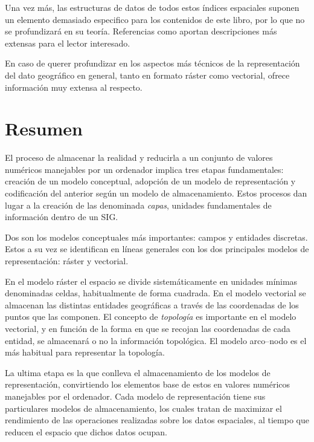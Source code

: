 \begin{multicols}{2}
Una vez más, las estructuras de datos de todos estos índices espaciales suponen un elemento demasiado especifico para los contenidos de este libro, por lo que no se profundizará en su teoría. Referencias como \cite{Buchmann1990Springer} aportan descripciones más extensas para el lector interesado.

En caso de querer profundizar en los aspectos más técnicos de la representación del dato geográfico en general, tanto en formato ráster como vectorial, \cite{Worboys2004CRC} ofrece información muy extensa al respecto.

\section{Resumen}

El proceso de almacenar la realidad y reducirla a un conjunto de valores numéricos manejables por un ordenador implica tres etapas fundamentales: creación de un modelo conceptual, adopción de un modelo de representación y codificación del anterior según un modelo de almacenamiento. Estos procesos dan lugar a la creación de las denominada \emph{capas}, unidades fundamentales de información dentro de un SIG.

Dos son los modelos conceptuales más importantes: campos y entidades discretas. Estos a su vez se identifican en líneas generales con los dos principales modelos de representación: ráster y vectorial.

En el modelo ráster el espacio se divide sistemáticamente en unidades mínimas denominadas celdas, habitualmente de forma cuadrada. En el modelo vectorial se almacenan las distintas entidades geográficas a través de las coordenadas de los puntos que las componen. El concepto de \emph{topología} es importante en el modelo vectorial, y en función de la forma en que se recojan las coordenadas de cada entidad, se almacenará o no la información topológica. El modelo arco--nodo es el más habitual para representar la topología.

La ultima etapa es la que conlleva el almacenamiento de los modelos de representación, convirtiendo los elementos base de estos en valores numéricos manejables por el ordenador. Cada modelo de representación tiene sus particulares modelos de almacenamiento, los cuales tratan de maximizar el rendimiento de las operaciones realizadas sobre los datos espaciales, al tiempo que reducen el espacio que dichos datos ocupan.

\end{multicols}
\pagestyle{empty}
